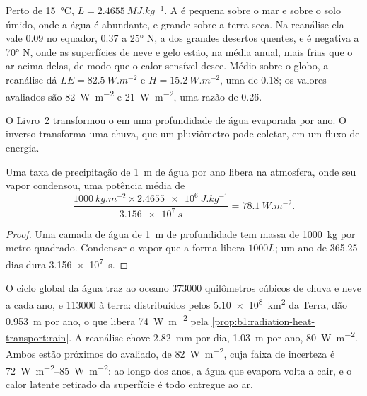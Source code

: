 Perto de \qty{15}{\celsius}, $L = \qty{2.4655}{MJ.kg^{-1}}$. A  é pequena sobre o mar
e sobre o solo úmido, onde a água é abundante, e grande sobre a terra seca. Na reanálise ela vale
\num{0.09} no equador, \num{0.37} a \ang{25} N, a  dos grandes desertos quentes, e é
negativa a \ang{70} N, onde as superfícies de neve e gelo estão, na média anual, mais frias que o ar
acima delas, de modo que o calor sensível desce. Médio sobre o globo, a reanálise dá $LE =
\qty{82.5}{W.m^{-2}}$ e $H = \qty{15.2}{W.m^{-2}}$, uma  de \num{0.18}; os valores
avaliados são \qty{82}{W.m^{-2}} e \qty{21}{W.m^{-2}}, uma razão de \num{0.26}.

O Livro~2 transformou o  em uma profundidade de água evaporada por ano. O
inverso transforma uma chuva, que um pluviômetro pode coletar, em um fluxo de energia.

\begin{proposition}\label{prop:b1:radiation-heat-transport:rain}
Uma taxa de precipitação de \qty{1}{m} de água por ano libera na atmosfera, onde seu vapor
condensou, uma potência média de
\[
  \frac{\qty{1000}{kg.m^{-2}} \times \qty{2.4655e6}{J.kg^{-1}}}{\qty{3.156e7}{s}}
  = \qty{78.1}{W.m^{-2}} .
\]
\end{proposition}

\begin{proof}
Uma camada de água de \qty{1}{m} de profundidade tem massa de \qty{1000}{kg} por metro quadrado.
Condensar o vapor que a forma libera $1000L$; um ano de \num{365.25} dias dura \qty{3.156e7}{s}.
\end{proof}

\begin{example}\label{ex:b1:radiation-heat-transport:rain}
O ciclo global da água traz ao oceano \num{373000} quilômetros cúbicos de chuva e neve a cada ano, e
\num{113000} à terra: distribuídos pelos \qty{5.10e8}{km^2} da Terra, dão \qty{0.953}{m} por ano, o
que libera \qty{74}{W.m^{-2}} pela \cref{prop:b1:radiation-heat-transport:rain}. A reanálise chove
\qty{2.82}{mm} por dia, \qty{1.03}{m} por ano, \qty{80}{W.m^{-2}}. Ambos estão próximos do  avaliado, de \qty{82}{W.m^{-2}}, cuja faixa de incerteza é \qtyrange{72}{85}{W.m^{-2}}:
ao longo dos anos, a água que evapora volta a cair, e o calor latente retirado da superfície é todo
entregue ao ar.
\end{example}

